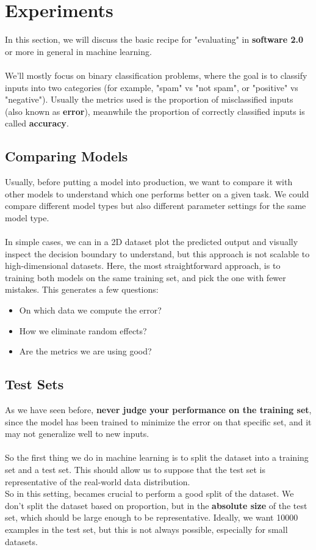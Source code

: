 \section{Experiments}%
In this section, we will discuss the basic recipe for "evaluating" in \textbf{software 2.0} or more in general in machine learning.
\\\\
We'll mostly focus on binary classification problems, where the goal is to classify inputs into two categories (for example, "spam" vs "not spam", or "positive" vs "negative").
Usually the metrics used is the proportion of misclassified inputs (also known as \textbf{error}),
meanwhile the proportion of correctly classified inputs is called \textbf{accuracy}.

\subsection{Comparing Models}
Usually, before putting a model into production, we want to compare it with other models to understand which one performs better on a given task.
We could compare different model types but also different parameter settings for the same model type.
\\\\
In simple cases, we can in a 2D dataset plot the predicted output and visually inspect the decision boundary to understand,
but this approach is not scalable to high-dimensional datasets.
Here, the most straightforward approach, is to training both models on the same training set, and pick the one with fewer mistakes.
This generates a few questions:
\begin{itemize}
    \item On which data we compute the error? 
    \item How we eliminate random effects? 
    \item Are the metrics we are using good?
\end{itemize}

\subsection{Test Sets}
As we have seen before, \textbf{never judge your performance on the training set}, since the model has been trained to minimize the error on that specific set, and it may not generalize well to new inputs.
\\\\
So the first thing we do in machine learning is to split the dataset into a training set and a test set.
This should allow us to suppose that the test set is representative of the real-world data distribution.
\\
So in this setting, becames crucial to perform a good split of the dataset.
We don't split the dataset based on proportion, but in the \textbf{absolute size} of the test set, which should be large enough to be representative.
Ideally, we want 10000 examples in the test set, but this is not always possible, especially for small datasets.

